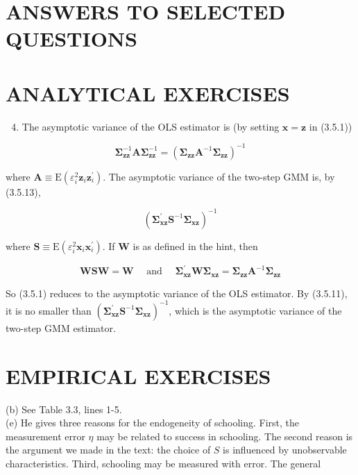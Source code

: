 \documentclass[10pt]{article}
\begin{document}
\section*{ANSWERS TO SELECTED QUESTIONS}
\section*{ANALYTICAL EXERCISES}
\begin{enumerate}
  \setcounter{enumi}{3}
  \item The asymptotic variance of the OLS estimator is (by setting $\mathbf{x}=\mathbf{z}$ in (3.5.1))
\end{enumerate}

$$
\boldsymbol{\Sigma}_{\mathbf{z z}}^{-1} \mathbf{A} \boldsymbol{\Sigma}_{\mathbf{z z}}^{-1}=\left(\boldsymbol{\Sigma}_{\mathbf{z z}} \mathbf{A}^{-1} \boldsymbol{\Sigma}_{\mathbf{z z}}\right)^{-1}
$$

where $\mathbf{A} \equiv \mathrm{E}\left(\varepsilon_{i}^{2} \mathbf{z}_{i} \mathbf{z}_{i}^{\prime}\right)$. The asymptotic variance of the two-step GMM is, by (3.5.13),

$$
\left(\boldsymbol{\Sigma}_{\mathbf{x z}}^{\prime} \mathbf{S}^{-1} \boldsymbol{\Sigma}_{\mathbf{x z}}\right)^{-1}
$$

where $\mathbf{S} \equiv \mathrm{E}\left(\varepsilon_{i}^{2} \mathbf{x}_{i} \mathbf{x}_{i}^{\prime}\right)$. If $\mathbf{W}$ is as defined in the hint, then

$$
\mathbf{W S W}=\mathbf{W} \quad \text { and } \quad \boldsymbol{\Sigma}_{\mathbf{x z}}^{\prime} \mathbf{W} \boldsymbol{\Sigma}_{\mathbf{x z}}=\boldsymbol{\Sigma}_{\mathbf{z z}} \mathbf{A}^{-1} \boldsymbol{\Sigma}_{\mathbf{z z}}
$$

So (3.5.1) reduces to the asymptotic variance of the OLS estimator. By (3.5.11), it is no smaller than $\left(\boldsymbol{\Sigma}_{\mathbf{x z}}^{\prime} \mathbf{S}^{-1} \boldsymbol{\Sigma}_{\mathbf{x z}}\right)^{-1}$, which is the asymptotic variance of the two-step GMM estimator.

\section*{EMPIRICAL EXERCISES}
(b) See Table 3.3, lines 1-5.\\
(e) He gives three reasons for the endogeneity of schooling. First, the measurement error $\eta$ may be related to success in schooling. The second reason is the argument we made in the text: the choice of $S$ is influenced by unobservable characteristics. Third, schooling may be measured with error. The general
\end{document}
